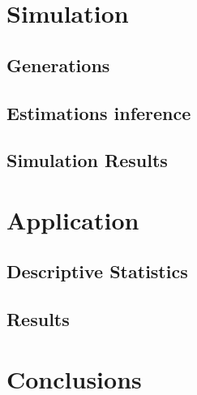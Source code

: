 \documentclass{article}
\begin{document}
\section{Simulation}

\subsection{Generations}

\subsection{Estimations inference}

\subsection{Simulation Results}

\section{Application}
\subsection{Descriptive Statistics}
\subsection{Results}

\section{Conclusions}



\newpage



\end{document}
